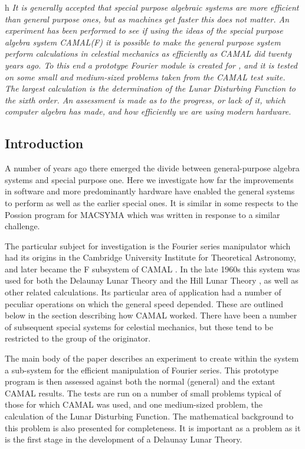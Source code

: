 h
\emph{It is generally accepted that special purpose algebraic systems
are more efficient than general purpose ones, but as machines get
faster this does not matter.  An experiment has been performed to see
if using the ideas of the special purpose algebra system CAMAL(F) it
is possible to make the general purpose system \REDUCE perform
calculations in celestial mechanics as efficiently as CAMAL did twenty
years ago.  To this end a prototype Fourier module is created for
\REDUCE, and it is tested on some small and medium-sized problems taken
from the CAMAL test suite. The largest calculation is the
determination of the Lunar Disturbing Function to the sixth order.  An
assessment is made as to the progress, or lack of it, which computer
algebra has made, and how efficiently we are using modern hardware.
}


\subsection{Introduction}

A number of years ago there emerged the divide between general-purpose
algebra systems and special purpose one.  Here we investigate how far
the improvements in software and more predominantly hardware have
enabled the general systems to perform as well as the earlier special
ones.  It is similar in some respects to the Possion program for
MACSYMA \cite{Fateman:74a} which was written in response to a similar
challenge.

The particular subject for investigation is the Fourier series
manipulator which had its origins in the Cambridge University
Institute for Theoretical Astronomy, and later became the F subsystem
of CAMAL \cite{Barton67b,CAMALF:83}.  In the late 1960s this system was
used for both the Delaunay Lunar Theory \cite{Delaunay:1860,Barton67a} and
the Hill Lunar Theory \cite{Bourne:72}, as well as other related
calculations.  Its particular area of application had a number of
peculiar operations on which the general speed depended.  These are
outlined below in the section describing how CAMAL worked.  There have
been a number of subsequent special systems for celestial mechanics,
but these tend to be restricted to the group of the originator.

The main body of the paper describes an experiment to create within
the \REDUCE system a sub-system for the efficient manipulation of
Fourier series.  This prototype program is then assessed against both
the normal (general) \REDUCE and the extant CAMAL results.  The tests
are run on a number of small problems typical of those for which CAMAL
was used, and one medium-sized problem, the calculation of the Lunar
Disturbing Function.  The mathematical background to this problem is
also presented for completeness.  It is important as a problem as it
is the first stage in the development of a Delaunay Lunar Theory.

